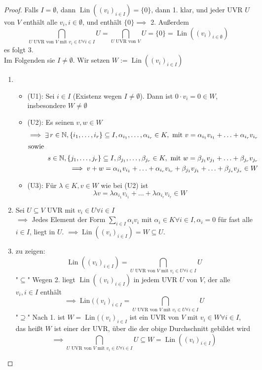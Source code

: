 \documentclass[a4paper]{scrartcl}
\DeclareMathOperator{\Exists}{\exists}
\DeclareMathOperator{\Forall}{\forall}
\DeclareMathOperator{\Lin}{Lin}
\theoremstyle{definition}
\theoremstyle{plain}
\theoremstyle{plain}
\theoremstyle{remark}
\theoremstyle{remark}
\theoremstyle{remark}
\theoremstyle{remark}
\theoremstyle{remark}
\begin{document}
\begin{proof}
Falls $I = \emptyset$, dann $\Lin((v_i)_{i\in I}) = \{0\}$, dann 1. klar, und jeder UVR $U$ von $V$ enthält alle $v_i, i\in \emptyset$, und enthält $\{0\} \implies$ 2. Außerdem
\[\bigcap_{\text{$U$ UVR von $V$ mit $v_i \in U \Forall i\in I$}} U = \bigcap_{\text{$U$ UVR von $V$}} U = \{0\} = \Lin((v_i)_{i\in\emptyset})\]
es folgt 3. \\

Im Folgenden sie $I \neq \emptyset$. Wir setzen $W:= \Lin((v_i)_{i\in I})$
\begin{enumerate}
\item \begin{itemize}
\item (U1): Sei $i \in I$ (Existenz wegen $I \neq \emptyset$). Dann ist $0\cdot v_i = 0\in W$, insbesondere $W\neq\emptyset$
\item (U2): Es seinen $v,w \in W$
\begin{align*}
\implies \Exists r\in\mathbb{N}, \{i_1, \ldots, i_r\} \subseteq I, \alpha_{i_1}, \ldots, \alpha_{i_r} \in K,~\text{mit}~v = \alpha_{i_1} v_{i_1} + \ldots + \alpha_{i_r} v_{i_r} \\
\intertext{sowie}
s\in\mathbb{N}, \{j_1, \ldots, j_r\} \subseteq I, \beta_{j_1}, \ldots, \beta_{j_r} \in K,~\text{mit}~w = \beta_{j_1} v_{j_1} + \ldots + \beta_{j_r} v_{j_r} \\
\implies v + w = \alpha_{i_1} v_{i_1} + \ldots + \alpha_{i_r} v_{i_r} + \beta_{j_1} v_{j_1} + \ldots + \beta_{j_s} v_{j_s} \in W
\end{align*}
\item (U3): Für $\lambda \in K, v\in W$ wie bei (U2) ist
\[\lambda v = \lambda \alpha_{i_1} v_{i_1} + \ldots + \lambda \alpha_{i_r} v_{i_r} \in W\]
\end{itemize}
\item Sei $U\subseteq V$ UVR mit $v_i \in U \Forall i\in I$ \\
         $\implies$ Jedes Element der Form $\displaystyle \sum_{i \in I} \alpha_i v_i$ mit $\alpha_i \in K \Forall i\in I, \alpha_i = 0$ für fast alle $i\in I$, liegt
in $U$. $\implies \Lin((v_i)_{i\in I}) = W \subseteq U$.
\item zu zeigen: \[\Lin((v_i)_{i \in I}) = \bigcap_{\text{$U$ UVR von $V$ mit $v_i \in U \Forall i\in I$}} U\]
"$\subseteq$" Wegen 2. liegt $\Lin((v_i)_{i\in I})$ in jedem UVR $U$ von $V$, der alle $v_i, i\in I$ enthält
\[\implies \Lin((v_i)_{i\in I} = \bigcap_{\text{$U$ UVR von $V$ mit $v_i \in U \Forall i\in I$}} U\]
"$\supseteq$" Nach 1. ist $W = \Lin((v_i)_{i\in I}$ ist ein UVR von $V$ mit $v_i \in W \Forall i\in I$, das heißt $W$ ist einer der UVR, über die der obige Durchschnitt gebildet wird
\[\implies \bigcap_{\text{$U$ UVR von $V$ mit $v_i \in U \Forall i\in I$}} U \subseteq W = \Lin((v_i)_{i\in I})\]
\end{enumerate}
\end{proof}
\end{document}
